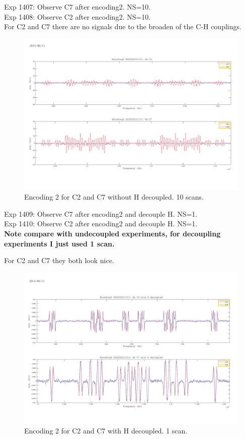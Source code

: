 \clearpage
Exp 1407: Observe C7 after encoding2. NS=10.\\
Exp 1408: Observe C2 after encoding2. NS=10.\\

For C2 and C7 there are no signals due to the broaden of the C-H couplings.

\begin{figure}[htb]
\begin{center}
\includegraphics[width=\columnwidth]{Encoding2_without_decouple.pdf}
\end{center}
\setlength{\abovecaptionskip}{-0.35cm}
\caption{\footnotesize{Encoding 2 for C2 and C7 without H decoupled. 10 scans.}}\label{1407and1408}
\end{figure}

\clearpage
Exp 1409: Observe C7 after encoding2 and decouple H. NS=1.\\
Exp 1410: Observe C2 after encoding2 and decouple H. NS=1.\\
\textbf{Note compare with undecoupled experiments, for decoupling experiments I just used 1 scan.}

For C2 and C7 they both look nice.

\begin{figure}[htb]
\begin{center}
\includegraphics[width=\columnwidth]{Encoding2_with_decouple.pdf}
\end{center}
\setlength{\abovecaptionskip}{-0.35cm}
\caption{\footnotesize{Encoding 2 for C2 and C7 with H decoupled. 1 scan.}}\label{1409and1410}
\end{figure}